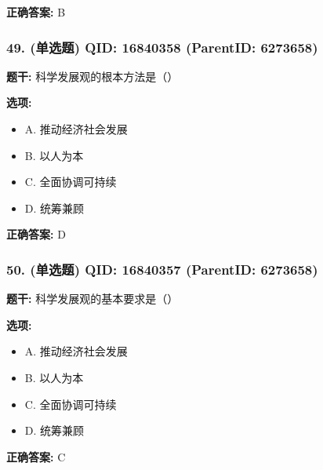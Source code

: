\documentclass[12pt,UTF8]{ctexart}
\begin{document}
\textbf{正确答案:}
B

\vspace{0.3em}\hrulefill\vspace{0.7em}

\subsubsection*{49. (单选题) \small QID: 16840358 (ParentID: 6273658)}

\textbf{题干:}
科学发展观的根本方法是（）



\textbf{选项:}
\begin{itemize}[leftmargin=*]

  \item A. 推动经济社会发展

  \item B. 以人为本

  \item C. 全面协调可持续

  \item D. 统筹兼顾

\end{itemize}

\textbf{正确答案:}
D

\vspace{0.3em}\hrulefill\vspace{0.7em}

\subsubsection*{50. (单选题) \small QID: 16840357 (ParentID: 6273658)}

\textbf{题干:}
科学发展观的基本要求是（）



\textbf{选项:}
\begin{itemize}[leftmargin=*]

  \item A. 推动经济社会发展

  \item B. 以人为本

  \item C. 全面协调可持续

  \item D. 统筹兼顾

\end{itemize}

\textbf{正确答案:}
C

\vspace{0.3em}\hrulefill\vspace{0.7em}
\end{document}
